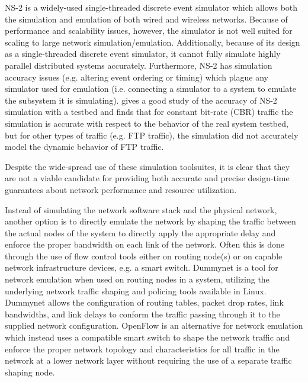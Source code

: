 NS-2\cite{ns2_real_time2004} is a widely-used single-threaded discrete
event simulator which allows both the simulation and emulation of both
wired and wireless networks.  Because of performance and scalability
issues, however, the simulator is not well suited for scaling to large
network simulation/emulation.  Additionally, because of its design as
a single-threaded discrete event simulator, it cannot fully simulate
highly parallel distributed systems accurately. Furthermore, NS-2 has
simulation accuracy issues (e.g. altering event ordering or timing)
which plague any simulator used for emulation (i.e. connecting a
simulator to a system to emulate the subsystem it is
simulating). \cite{simulator_comparison_2003} gives a good study of
the accuracy of NS-2 simulation with a testbed and finds that for
constant bit-rate (CBR) traffic the simulation is accurate with
respect to the behavior of the real system testbed, but for other
types of traffic (e.g. FTP traffic), the simulation did not accurately
model the dynamic behavior of FTP traffic.

Despite the wide-spread use of these simulation toolsuites, it is
clear that they are not a viable candidate for providing both accurate
and precise design-time guarantees about network performance and
resource utilization.

Instead of simulating the network software stack and the physical
network, another option is to directly emulate the network by shaping
the traffic between the actual nodes of the system to directly apply
the appropriate delay and enforce the proper bandwidth on each link of
the network.  Often this is done through the use of flow control tools
either on routing node(s) or on capable network infrastructure
devices, e.g. a smart switch.
Dummynet\cite{dummynet1997}\cite{dummynetRevisited2010} is a tool for
network emulation when used on routing nodes in a system, utilizing
the underlying network traffic shaping and policing tools available in
Linux.  Dummynet allows the configuration of routing tables, packet
drop rates, link bandwidths, and link delays to conform the traffic
passing through it to the supplied network configuration.
OpenFlow\cite{openflow2009openflow} is an alternative for network
emulation which instead uses a compatible smart switch to shape the
network traffic and enforce the proper network topology and
characteristics for all traffic in the network at a lower network
layer without requiring the use of a separate traffic shaping node.

